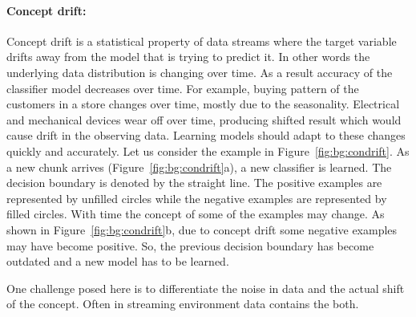 \documentclass[a4paper, 11pt, oneside]{book}
\begin{document}
\paragraph{Concept drift:}
Concept drift is a statistical property of data streams where the target variable drifts away from the model that is trying to predict it. In other words the underlying data distribution is changing over time. As a result accuracy of the classifier model decreases over time. For example, buying pattern of the customers in a store changes over time, mostly due to the seasonality. Electrical and mechanical devices wear off over time, producing shifted result which would cause drift in the observing data. Learning models should adapt to these changes quickly and accurately. Let us consider the example in Figure~\ref{fig:bg:condrift}. As a new chunk arrives (Figure~\ref{fig:bg:condrift}a), a new classifier is learned. The decision boundary is denoted by the straight line. The positive examples are represented by unfilled circles while the negative examples are represented by filled circles. With time the concept of some of the examples may change. As shown in Figure~\ref{fig:bg:condrift}b, due to concept drift some negative examples may have become positive. So, the previous decision boundary has become outdated and a new model has to be learned.

One challenge posed here is to differentiate the noise in data and the actual shift of the concept. Often in streaming environment data contains the both. 
\end{document}
